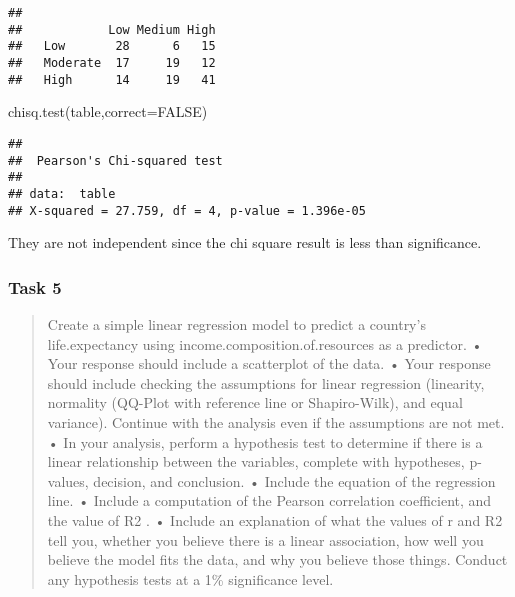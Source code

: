 \documentclass[
]{article}
\newenvironment{Shaded}{\begin{snugshade}}{\end{snugshade}}
\newcommand{\AttributeTok}[1]{\textcolor[rgb]{0.77,0.63,0.00}{#1}}
\newcommand{\ConstantTok}[1]{\textcolor[rgb]{0.00,0.00,0.00}{#1}}
\newcommand{\FunctionTok}[1]{\textcolor[rgb]{0.00,0.00,0.00}{#1}}
\newcommand{\NormalTok}[1]{#1}
\newcommand{\SpecialCharTok}[1]{\textcolor[rgb]{0.00,0.00,0.00}{#1}}
\newcommand{\StringTok}[1]{\textcolor[rgb]{0.31,0.60,0.02}{#1}}
\begin{document}
\begin{verbatim}
##           
##            Low Medium High
##   Low       28      6   15
##   Moderate  17     19   12
##   High      14     19   41
\end{verbatim}

\begin{Shaded}
\begin{Highlighting}[]
\FunctionTok{chisq.test}\NormalTok{(table,}\AttributeTok{correct=}\ConstantTok{FALSE}\NormalTok{)}
\end{Highlighting}
\end{Shaded}

\begin{verbatim}
## 
##  Pearson's Chi-squared test
## 
## data:  table
## X-squared = 27.759, df = 4, p-value = 1.396e-05
\end{verbatim}

They are not independent since the chi square result is less than
significance.

\hypertarget{task-5}{%
\subsubsection{Task 5}\label{task-5}}

\begin{quote}
Create a simple linear regression model to predict a country's
life.expectancy using income.composition.of.resources as a predictor. •
Your response should include a scatterplot of the data. • Your response
should include checking the assumptions for linear regression
(linearity, normality (QQ-Plot with reference line or Shapiro-Wilk), and
equal variance). Continue with the analysis even if the assumptions are
not met. • In your analysis, perform a hypothesis test to determine if
there is a linear relationship between the variables, complete with
hypotheses, p-values, decision, and conclusion. • Include the equation
of the regression line. • Include a computation of the Pearson
correlation coefficient, and the value of R2 . • Include an explanation
of what the values of r and R2 tell you, whether you believe there is a
linear association, how well you believe the model fits the data, and
why you believe those things. Conduct any hypothesis tests at a 1\%
significance level.
\end{quote}

\begin{Shaded}
\end{Shaded}
\end{document}
